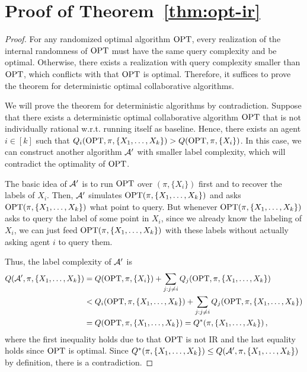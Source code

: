 \section{Proof of Theorem~\ref{thm:opt-ir}}\label{app:opt-ir}
\begin{proof}
    For any randomized optimal algorithm $\textrm{OPT}$, every realization of the internal randomness of $\textrm{OPT}$ must have the same query complexity and be optimal.
    Otherwise, there exists a realization with query complexity smaller than $\textrm{OPT}$, which conflicts with that $\textrm{OPT}$ is optimal. 
    Therefore, it suffices to prove the theorem for deterministic optimal collaborative algorithms.
    
    We will prove the theorem for deterministic algorithms by contradiction.
    Suppose that there exists a deterministic optimal collaborative algorithm $\textrm{OPT}$ that is not individually rational w.r.t. running itself as baseline. Hence, there exists an agent $i\in [k]$ such that $Q_{i}(\textrm{OPT},\pi, \{X_1,\ldots,X_k\}) > Q(\textrm{OPT}, \pi, \{X_i\})$.   
    In this case, we can construct another algorithm $\mathcal{A}'$ with smaller label complexity, which will contradict  the optimality of $\textrm{OPT}$.
    
    The basic idea of $\mathcal{A}'$ is to run $\textrm{OPT}$ over $(\pi,\{X_i\})$ first and to recover the labels of $X_i$. 
    Then, $\mathcal{A}'$ simulates $\textrm{OPT}(\pi, \{X_1,\ldots,X_k\})$ and asks $\textrm{OPT}(\pi, \{X_1,\ldots,X_k\})$ what point to query. But whenever $\textrm{OPT}(\pi, \{X_1,\ldots,X_k\})$ asks to query the label of some point in $X_i$, since we already know the labeling of $X_i$, we can just feed $\textrm{OPT}(\pi, \{X_1,\ldots,X_k\})$ with these labels without actually asking agent $i$ to query them. 
    
    Thus, the label complexity of $\mathcal{A}'$ is
    \begin{align*}
        Q(\mathcal{A}',\pi,\{X_1,\ldots,X_k\}) &= Q(\textrm{OPT}, \pi, \{X_i\}) + \sum_{j:j\neq i}Q_j(\textrm{OPT}, \pi, \{X_1,\ldots,X_k\})\\
        &< Q_{i}(\textrm{OPT},\pi, \{X_1,\ldots,X_k\}) + \sum_{j:j\neq i}Q_j(\textrm{OPT}, \pi, \{X_1,\ldots,X_k\}) \\
        &= Q(\textrm{OPT}, \pi, \{X_1,\ldots,X_k\})= Q^*(\pi, \{X_1,\ldots,X_k\})\,,
    \end{align*}
    where the first inequality holds due to that $\textrm{OPT}$ is not IR and the last equality holds since $\textrm{OPT}$ is optimal.
    Since $Q^*(\pi, \{X_1,\ldots,X_k\})\leq Q(\mathcal{A}',\pi,\{X_1,\ldots,X_k\})$ by definition, there is a contradiction.
\end{proof}